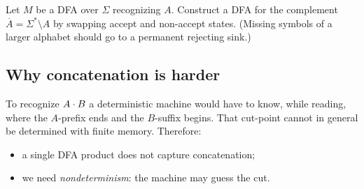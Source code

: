 \begin{exercise}
Let $M$ be a DFA over $\Sigma$ recognizing $A$. Construct a DFA for the
complement $\overline{A}=\Sigma^*\setminus A$ by swapping accept and
non-accept states. (Missing symbols of a larger alphabet should go to a
permanent rejecting sink.)
\end{exercise}

\subsection{Why concatenation is harder}
To recognize $A\mathbin{\cdot} B$ a deterministic machine would have to know, while
reading, where the $A$-prefix ends and the $B$-suffix begins. That cut-point
cannot in general be determined with finite memory. Therefore:
\begin{itemize}
  \item a single DFA product does not capture concatenation;
  \item we need \emph{nondeterminism}: the machine may guess the cut.
\end{itemize}
